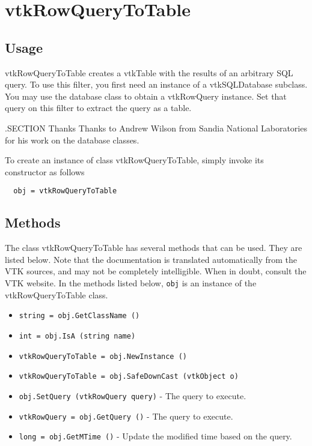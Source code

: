 \section{vtkRowQueryToTable}

\subsection{Usage}

 vtkRowQueryToTable creates a vtkTable with the results of an arbitrary SQL
 query.  To use this filter, you first need an instance of a vtkSQLDatabase
 subclass.  You may use the database class to obtain a vtkRowQuery instance.
 Set that query on this filter to extract the query as a table.

 .SECTION Thanks
 Thanks to Andrew Wilson from Sandia National Laboratories for his work
 on the database classes.


To create an instance of class vtkRowQueryToTable, simply
invoke its constructor as follows
\begin{verbatim}
  obj = vtkRowQueryToTable
\end{verbatim}
\subsection{Methods}

The class vtkRowQueryToTable has several methods that can be used.
  They are listed below.
Note that the documentation is translated automatically from the VTK sources,
and may not be completely intelligible.  When in doubt, consult the VTK website.
In the methods listed below, \verb|obj| is an instance of the vtkRowQueryToTable class.
\begin{itemize}
\item  \verb|string = obj.GetClassName ()|

\item  \verb|int = obj.IsA (string name)|

\item  \verb|vtkRowQueryToTable = obj.NewInstance ()|

\item  \verb|vtkRowQueryToTable = obj.SafeDownCast (vtkObject o)|

\item  \verb|obj.SetQuery (vtkRowQuery query)| -  The query to execute.

\item  \verb|vtkRowQuery = obj.GetQuery ()| -  The query to execute.

\item  \verb|long = obj.GetMTime ()| -  Update the modified time based on the query.

\end{itemize}
